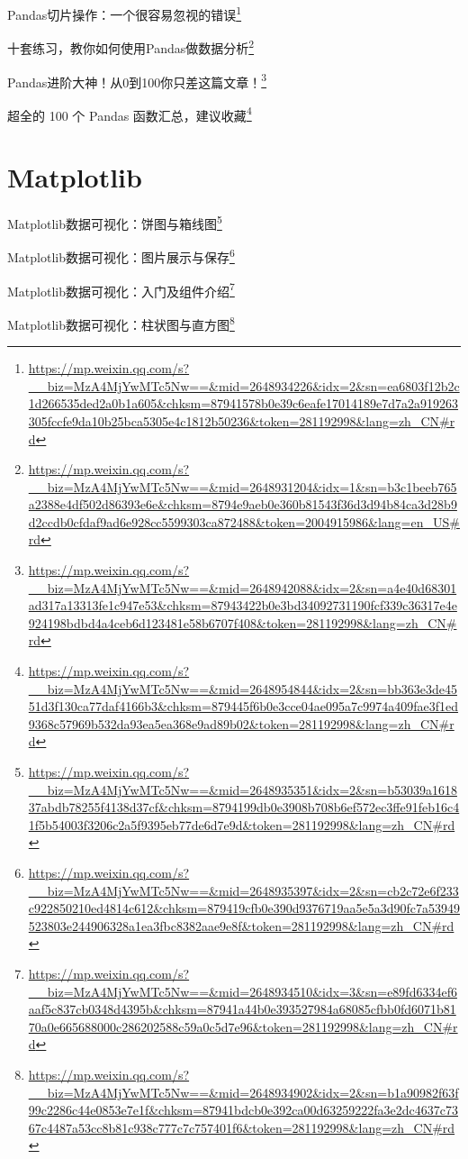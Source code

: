 \documentclass[]{ctexbook}
\renewcommand{\href}[2]{#2\footnote{\url{#1}}}
\begin{document}
\href{https://mp.weixin.qq.com/s?__biz=MzA4MjYwMTc5Nw==\&mid=2648934226\&idx=2\&sn=ea6803f12b2c1d266535ded2a0b1a605\&chksm=87941578b0e39c6eafe17014189e7d7a2a919263305fccfe9da10b25bca5305e4c1812b50236\&token=281192998\&lang=zh_CN\#rd}{Pandas切片操作：一个很容易忽视的错误}

\href{https://mp.weixin.qq.com/s?__biz=MzA4MjYwMTc5Nw==\&mid=2648931204\&idx=1\&sn=b3c1beeb765a2388e4df502d86393e6e\&chksm=8794e9aeb0e360b81543f36d3d94b84ca3d28b9d2ccdb0cfdaf9ad6e928cc5599303ca872488\&token=2004915986\&lang=en_US\#rd}{十套练习，教你如何使用Pandas做数据分析}

\href{https://mp.weixin.qq.com/s?__biz=MzA4MjYwMTc5Nw==\&mid=2648942088\&idx=2\&sn=a4e40d68301ad317a13313fe1c947e53\&chksm=87943422b0e3bd34092731190fcf339c36317e4e924198bdbd4a4ceb6d123481e58b6707f408\&token=281192998\&lang=zh_CN\#rd}{Pandas进阶大神！从0到100你只差这篇文章！}

\href{https://mp.weixin.qq.com/s?__biz=MzA4MjYwMTc5Nw==\&mid=2648954844\&idx=2\&sn=bb363e3de4551d3f130ca77daf4166b3\&chksm=879445f6b0e3cce04ae095a7c9974a409fae3f1ed9368c57969b532da93ea5ea368e9ad89b02\&token=281192998\&lang=zh_CN\#rd}{超全的 100 个 Pandas 函数汇总，建议收藏}

\hypertarget{matplotlib}{%
\section{Matplotlib}\label{matplotlib}}

\href{https://mp.weixin.qq.com/s?__biz=MzA4MjYwMTc5Nw==\&mid=2648935351\&idx=2\&sn=b53039a161837abdb78255f4138d37cf\&chksm=8794199db0e3908b708b6ef572ec3ffe91feb16c41f5b54003f3206c2a5f9395eb77de6d7e9d\&token=281192998\&lang=zh_CN\#rd}{Matplotlib数据可视化：饼图与箱线图}

\href{https://mp.weixin.qq.com/s?__biz=MzA4MjYwMTc5Nw==\&mid=2648935397\&idx=2\&sn=cb2c72e6f233c922850210ed4814c612\&chksm=879419cfb0e390d9376719aa5e5a3d90fc7a53949523803e244906328a1ea3fbc8382aae9e8f\&token=281192998\&lang=zh_CN\#rd}{Matplotlib数据可视化：图片展示与保存}

\href{https://mp.weixin.qq.com/s?__biz=MzA4MjYwMTc5Nw==\&mid=2648934510\&idx=3\&sn=e89fd6334ef6aaf5c837cb0348d4395b\&chksm=87941a44b0e393527984a68085cfbb0fd6071b8170a0e665688000c286202588c59a0c5d7e96\&token=281192998\&lang=zh_CN\#rd}{Matplotlib数据可视化：入门及组件介绍}

\href{https://mp.weixin.qq.com/s?__biz=MzA4MjYwMTc5Nw==\&mid=2648934902\&idx=2\&sn=b1a90982f63f99c2286c44e0853e7e1f\&chksm=87941bdcb0e392ca00d63259222fa3e2dc4637c7367c4487a53cc8b81c938c777c7c757401f6\&token=281192998\&lang=zh_CN\#rd}{Matplotlib数据可视化：柱状图与直方图}
\end{document}
